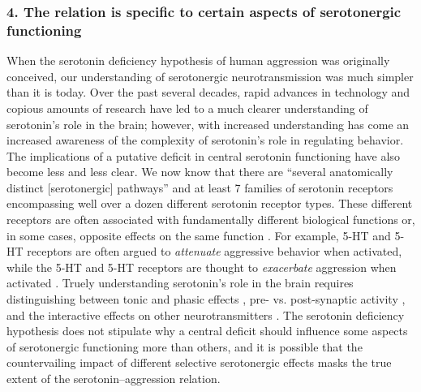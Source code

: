 \subsubsection{4. The relation is specific to certain aspects of serotonergic functioning}
When the serotonin deficiency hypothesis of human aggression was originally conceived, our understanding of serotonergic neurotransmission was much simpler than it is today. Over the past several decades, rapid advances in technology and copious amounts of research have led to a much clearer understanding of serotonin's role in the brain; however, with increased understanding has come an increased awareness of the complexity of serotonin's role in regulating behavior. The implications of a putative deficit in central serotonin functioning have also become less and less clear. We now know that there are ``several anatomically distinct [serotonergic]  pathways'' \parencite[212]{Murphy1996} and at least 7 families of serotonin receptors encompassing well over a dozen different serotonin receptor types. These different receptors are often associated with fundamentally different biological functions or, in some cases, opposite effects on the same function \parencite{Kitson2007}. For example, 5-HT and 5-HT receptors are often argued to \emph{attenuate} aggressive behavior when activated, while the 5-HT and 5-HT receptors are thought to \emph{exacerbate} aggression when activated \parencite{Quadros2009}. Truely understanding serotonin's role in the brain requires distinguishing between tonic and phasic effects \parencite[e.g.,][]{Boer2005, Erp2000, Vegt2003}, pre- vs. post-synaptic activity \parencite{Boer2005, Olivier2005}, and the interactive effects on other neurotransmitters \parencite{Olivier2005}. The serotonin deficiency hypothesis does not stipulate why a central deficit should influence some aspects of serotonergic functioning more than others, and it is possible that the countervailing impact of different selective serotonergic effects masks the true extent of the serotonin--aggression relation.


